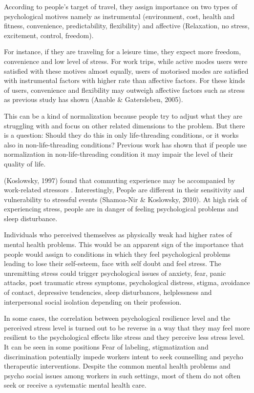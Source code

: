 \documentclass[
11pt, %
oneside, %
english, %
singlespacing, %
]{macthesis} %
\begin{document}
According to people's target of travel, they assign importance on two types of psychological motives namely as instrumental (environment, cost, health and fitness, convenience, predictability, flexibility) and affective (Relaxation, no stress, excitement, control, freedom).

For instance, if they are traveling for a leisure time, they expect more freedom, convenience and low level of stress. For work trips, while active modes users were satisfied with these motives almost equally, users of motorised modes are satisfied with instrumental factors with higher rate than affective factors. For these kinds of users, convenience and flexibility may outweigh affective factors such as stress as previous study has shown (Anable \& Gatersleben, 2005).

This can be a kind of normalization because people try to adjust what they are struggling with and focus on other related dimensions to the problem. But there is a question: Should they do this in only life-threading conditions, or it works also in non-life-threading conditions? Previous work has shown that if people use normalization in non-life-threading condition it may impair the level of their quality of life.

(Koslowsky, 1997) found that commuting experience may be accompanied by work-related stressors . Interestingly, People are different in their sensitivity and vulnerability to stressful events (Shamoa-Nir \& Koslowsky, 2010). At high risk of experiencing stress, people are in danger of feeling psychological problems and sleep disturbance.

Individuals who perceived themselves as physically weak had higher rates of mental health problems. This would be an apparent sign of the importance that people would assign to conditions in which they feel psychological problems leading to lose their self-esteem, face with self doubt and feel stress. The unremitting stress could trigger psychological issues of anxiety, fear, panic attacks, post traumatic stress symptoms, psychological distress, stigma, avoidance of contact, depressive tendencies, sleep disturbances, helplessness and interpersonal social isolation depending on their profession.

In some cases, the correlation between psychological resilience level and the perceived stress level is turned out to be reverse in a way that they may feel more resilient to the psychological effects like stress and they perceive less stress level. It can be seen in some positions Fear of labeling, stigmatization and discrimination potentially impede workers intent to seek counselling and psycho therapeutic interventions. Despite the common mental health problems and psycho social issues among workers in such settings, most of them do not often seek or receive a systematic mental health care.
\end{document}
